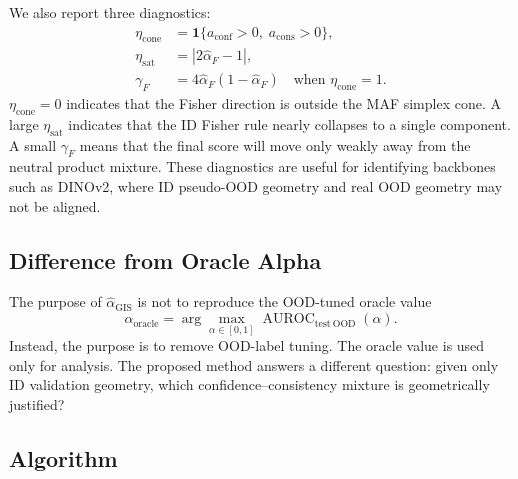 We also report three diagnostics:
\begin{align}
    \eta_{\mathrm{cone}}
    &=
    \mathbf{1}\{a_{\mathrm{conf}}>0,\;a_{\mathrm{cons}}>0\},\\
    \eta_{\mathrm{sat}}
    &=
    |2\hat{\alpha}_{F}-1|,\\
    \gamma_F
    &=
    4\hat{\alpha}_{F}(1-\hat{\alpha}_{F})
    \quad \text{when } \eta_{\mathrm{cone}}=1.
\end{align}
$\eta_{\mathrm{cone}}=0$ indicates that the Fisher direction is outside the MAF
simplex cone.  A large $\eta_{\mathrm{sat}}$ indicates that the ID Fisher rule
nearly collapses to a single component.  A small $\gamma_F$ means that the
final score will move only weakly away from the neutral product mixture.  These
diagnostics are useful for identifying backbones such as DINOv2, where ID
pseudo-OOD geometry and real OOD geometry may not be aligned.

\subsection{Difference from Oracle Alpha}

The purpose of $\hat{\alpha}_{\mathrm{GIS}}$ is not to reproduce the
OOD-tuned oracle value
\begin{equation}
    \alpha_{\mathrm{oracle}}
    =
    \arg\max_{\alpha\in[0,1]}
    \operatorname{AUROC}_{\mathrm{test\ OOD}}(\alpha).
\end{equation}
Instead, the purpose is to remove OOD-label tuning.  The oracle value is used
only for analysis.  The proposed method answers a different question:
given only ID validation geometry, which confidence--consistency mixture is
geometrically justified?

\subsection{Algorithm}

